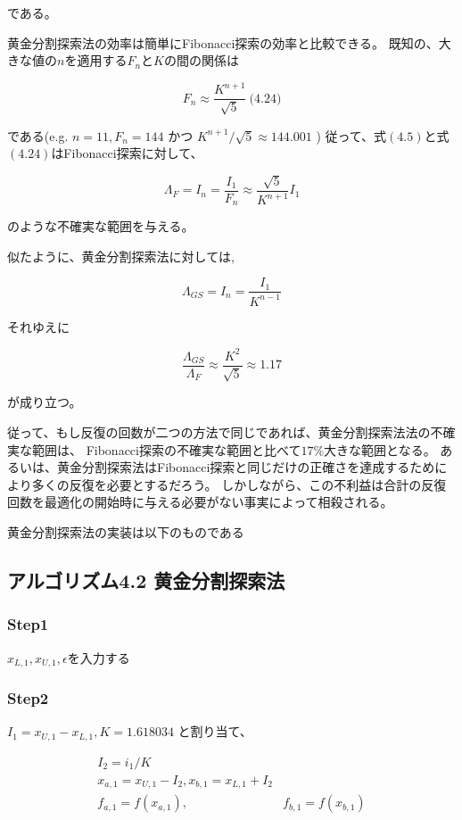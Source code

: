 である。

黄金分割探索法の効率は簡単にFibonacci探索の効率と比較できる。
既知の、大きな値の$n$を適用する$F_n$と$K$の間の関係は

$$F_n \approx
\frac{K^{n+1}}{\sqrt{5}}
\ \text{(4.24)}$$

である(e.g. $n=11, F_n =144$ かつ $K^{n+1} /
\sqrt{5} \approx 144.001$ )
従って、式$(4.5)$と式$(4.24)$はFibonacci探索に対して、

$$ \Lambda_F = I_n =
\frac{I_1}{F_n} \approx
\frac{\sqrt{5}}{K^{n+1}} I_1
$$

のような不確実な範囲を与える。

似たように、黄金分割探索法に対しては,

$$\Lambda_{GS} = I_n =
\frac{I_1}{K^{n-1}}$$

それゆえに

$$
\frac{\Lambda_{GS}}{\Lambda_F}
\approx \frac{K^2}{\sqrt{5}}
\approx 1.17 $$

が成り立つ。

従って、もし反復の回数が二つの方法で同じであれば、黄金分割探索法法の不確実な範囲は、
Fibonacci探索の不確実な範囲と比べて$17\%$大きな範囲となる。
あるいは、黄金分割探索法はFibonacci探索と同じだけの正確さを達成するためにより多くの反復を必要とするだろう。
しかしながら、この不利益は合計の反復回数を最適化の開始時に与える必要がない事実によって相殺される。

黄金分割探索法の実装は以下のものである

\newpage

\subsection*{アルゴリズム4.2 黄金分割探索法}\label{-4-2-}

\subsubsection*{Step1}\label{step1}

$x_{L,1}, x_{U,1}, \epsilon$を入力する

\subsubsection*{Step2}\label{step2}

$I_1 = x_{U,1} - x_{L,1}, K = 1.618034$ と割り当て、

$$ \begin{array}{ll}I_2 = i_1 / K
\\ x_{a,1} = x_{U,1} - I_2,
x_{b,1} = x_{L,1} + I_2 \\
f_{a,1} = f(x_{a,1}), & f_{b,1} = f(x_{b,1})
\end{array} $$

